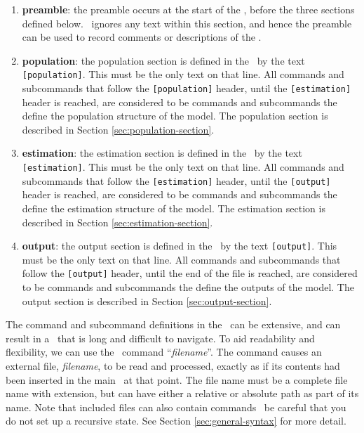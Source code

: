 \begin{enumerate}
\item \textbf{preamble}: 
the preamble occurs at the start of the \config, before the three sections defined below. \SPM\ ignores any text within this section, and hence the preamble can be used to record comments or descriptions of the \config. 

\item \textbf{population}: 
the population section is defined in the \config\ by the text \texttt{[population]}. This must be the only text on that line. All commands and subcommands that follow the \texttt{[population]} header, until the \texttt{[estimation]} header is reached, are considered to be commands and subcommands the define the population structure of the model. The population section is described in Section \ref{sec:population-section}.

\item \textbf{estimation}:
the estimation section is defined in the \config\ by the text \texttt{[estimation]}. This must be the only text on that line. All commands and subcommands that follow the \texttt{[estimation]} header, until the \texttt{[output]} header is reached, are considered to be commands and subcommands the define the estimation structure of the model.  The estimation section is described in Section \ref{sec:estimation-section}.

\item \textbf{output}:
the output section is defined in the \config\ by the text \texttt{[output]}. This must be the only text on that line. All commands and subcommands that follow the \texttt{[output]} header, until the end of the file is reached, are considered to be commands and subcommands the define the outputs of the model.  The output section is described in Section \ref{sec:output-section}.

\end{enumerate}

The command and subcommand definitions in the \config\ can be extensive, and can result in a \config\ that is long and difficult to navigate. To aid readability and flexibility, we can use the \config\ command  ``\emph{filename}''. The command causes an external file, \emph{filename}, to be read and processed, exactly as if its contents had been inserted in the main \config\ at that point. The file name must be a complete file name with extension, but can have either a relative or absolute path as part of its name. Note that included files can also contain  commands \textemdash\ be careful that you do not set up a recursive state. See Section \ref{sec:general-syntax} for more detail.

